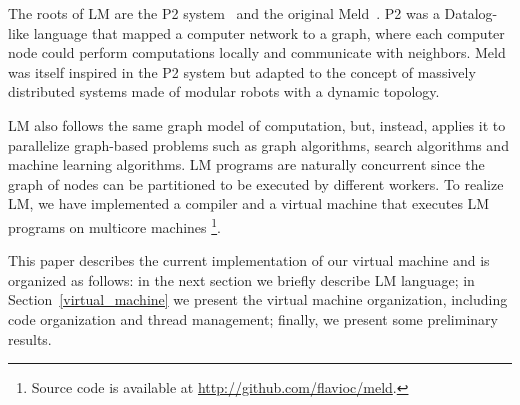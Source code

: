 The roots of LM are the P2 system~\cite{Loo-condie-garofalakis-p2} and the original Meld~\cite{ashley-rollman-derosa-iros07wksp,ashley-rollman-iclp09}.
P2 was a Datalog-like language that mapped a computer network
to a graph, where each computer node could perform computations locally and communicate with neighbors.
Meld was itself inspired in the P2 system but adapted to the concept of massively distributed systems
made of modular robots with a dynamic topology.

LM also follows the same graph model of computation, but, instead, applies it to parallelize graph-based problems such as
graph algorithms, search algorithms and machine learning algorithms. LM programs are naturally concurrent since the graph of nodes
can be partitioned to be executed by different workers.
To realize LM, we have implemented a compiler and a virtual machine that executes LM programs on multicore machines
\footnote{Source code is available at \url{http://github.com/flavioc/meld}.}.

This paper describes the current implementation of
our virtual machine and is organized as follows: in the next section we
briefly describe LM language; in Section~\ref{virtual_machine} we present the virtual machine organization, including code organization and thread management; finally, we present some preliminary results.